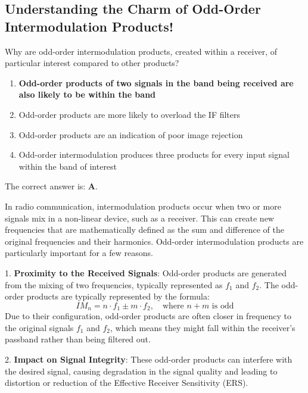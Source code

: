 \subsection{Understanding the Charm of Odd-Order Intermodulation Products!}

\begin{tcolorbox}[colback=gray!10, colframe=black, title=E4D11`]
Why are odd-order intermodulation products, created within a receiver, of particular interest compared to other products? 

\begin{enumerate}[label=\Alph*.]
    \item \textbf{Odd-order products of two signals in the band being received are also likely to be within the band}
    \item Odd-order products are more likely to overload the IF filters
    \item Odd-order products are an indication of poor image rejection
    \item Odd-order intermodulation produces three products for every input signal within the band of interest
\end{enumerate} \end{tcolorbox}

The correct answer is: \textbf{A}.

In radio communication, intermodulation products occur when two or more signals mix in a non-linear device, such as a receiver. This can create new frequencies that are mathematically defined as the sum and difference of the original frequencies and their harmonics. Odd-order intermodulation products are particularly important for a few reasons.

1. \textbf{Proximity to the Received Signals}: Odd-order products are generated from the mixing of two frequencies, typically represented as \( f_1 \) and \( f_2 \). The odd-order products are typically represented by the formula:
   \[
   IM_{n} = n \cdot f_1 \pm m \cdot f_2, \quad \text{where } n+m \text{ is odd}
   \]
   Due to their configuration, odd-order products are often closer in frequency to the original signals \( f_1 \) and \( f_2 \), which means they might fall within the receiver's passband rather than being filtered out.

2. \textbf{Impact on Signal Integrity}: These odd-order products can interfere with the desired signal, causing degradation in the signal quality and leading to distortion or reduction of the Effective Receiver Sensitivity (ERS). 


